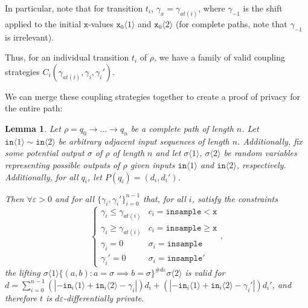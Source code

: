 \documentclass[12pt]{article}
\newcommand{\gguard}[1][x]{\texttt{insample}\geq#1}
\newcommand{\lguard}[1][x]{\texttt{insample} < #1}
\newcommand{\brangle}[1]{\langle#1 \rangle}
\newtheorem{lemma}[thm]{Lemma}
\theoremstyle{definition}
\begin{document}
In particular, note that for transition $t_i$, $\gamma_x = \gamma_{at(i)}$, where $\gamma_{-1}$ is the shift applied to the initial $\texttt{x}$-values $\texttt{x}_0\brangle{1}$ and $\texttt{x}_0\brangle{2}$ (for complete paths, note that $\gamma_{-1}$ is irrelevant).

Thus, for an individual transition $t_i$ of $\rho$, we have a family of valid coupling strategies $C_i(\gamma_{at(i)}, \gamma_i, \gamma_i')$. 

We can merge these coupling strategies together to create a proof of privacy for the entire path: 

\begin{lemma}\label{multTransitionsCouplingProof}
    Let $\rho = q_0\to \ldots \to q_n$ be a complete path of length $n$. 
    Let $\texttt{in}\brangle{1}\sim \texttt{in}\brangle{2}$ be arbitrary adjacent input sequences of length $n$. Additionally, fix some potential output $\sigma$ of $\rho$ of length $n$ and let $\sigma\brangle{1}$, $\sigma\brangle{2}$ be random variables representing possible outputs of $\rho$ given inputs $\texttt{in}\brangle{1}$ and $\texttt{in}\brangle{2}$, respectively. Additionally, for all $q_i$, let $P(q_i) = (d_i, d_i')$.

    Then $\forall \varepsilon>0$ and for all $\{\gamma_i, \gamma_i'\}_{i=0}^{n-1}$ that, for all $i$, satisfy the constraints \[
        \begin{cases}
          \gamma_i\leq\gamma_{at(i)} & c_i = \lguard[\texttt{x}]\\
          \gamma_i\geq\gamma_{at(i)} & c_i = \gguard[\texttt{x}]\\
          \gamma_i=0 & \sigma_i = \texttt{insample}\\
          \gamma_i'=0 & \sigma_i = \texttt{insample}'
        \end{cases},
      \]
      the lifting $\sigma\brangle{1}\{(a, b): a=\sigma\implies b=\sigma\}^{\#d\varepsilon}\sigma\brangle{2}$ is valid for $d = \sum_{i=0}^{n-1}(|-\texttt{in}_i\brangle{1}+\texttt{in}_i\brangle{2}-\gamma_i|)d_i+(|-\texttt{in}_i\brangle{1}+\texttt{in}_i\brangle{2}-\gamma_i'|)d_i'$, and therefore $t$ is $d\varepsilon$-differentially private. 
\end{lemma}
\end{document}
